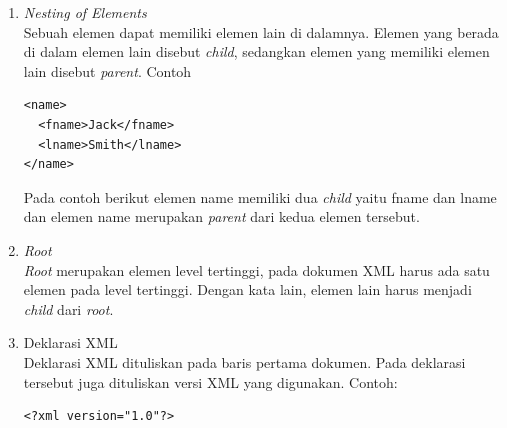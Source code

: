 \begin{enumerate}
\item \textit{Nesting of Elements} \\
Sebuah elemen dapat memiliki elemen lain di dalamnya. Elemen yang berada di
dalam elemen lain disebut \textit{child}, sedangkan elemen yang memiliki elemen
lain disebut \textit{parent}. Contoh
\begin{verbatim}
<name>
  <fname>Jack</fname>
  <lname>Smith</lname>
</name>
\end{verbatim}
Pada contoh berikut elemen name memiliki dua
\textit{child} yaitu fname dan lname dan elemen name merupakan \textit{parent}
dari kedua elemen tersebut.

\item \textit{Root} \\
\textit{Root} merupakan elemen level tertinggi, pada dokumen XML harus
ada satu elemen pada level tertinggi. Dengan kata lain, elemen lain harus menjadi
\textit{child} dari \textit{root}.

\item Deklarasi XML \\
Deklarasi XML dituliskan pada baris pertama dokumen. Pada deklarasi tersebut
juga dituliskan versi XML yang digunakan. Contoh:
\begin{verbatim}
<?xml version="1.0"?>
\end{verbatim}
\end{enumerate}

